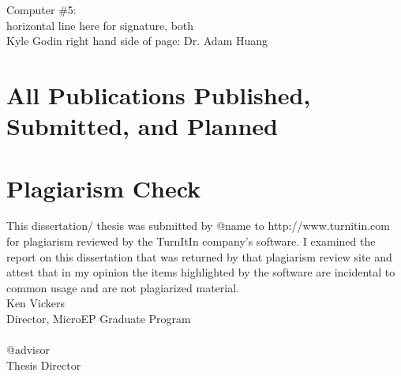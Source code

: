  Computer \#5:\\
 
 horizontal line here for signature, both\\
 Kyle Godin right hand side of page: Dr. Adam Huang
 
 \chapter{All Publications Published, Submitted, and Planned}
 
 \chapter{Plagiarism Check}
 This dissertation/ thesis was submitted by @name to http://www.turnitin.com for plagiarism reviewed by the TurnItIn company's software.  I examined the report on this dissertation that was returned by that plagiarism review site and attest that in my opinion the items highlighted by the software are incidental to common usage and are not plagiarized material.
 \vspace{1in}
 \makebox[1.5in]{\hrulefill}\\
 Ken Vickers\\
 Director, MicroEP Graduate Program\\
 \vspace{1in}
 \makebox[1.5in]{\hrulefill}\\
 @advisor\\
 Thesis Director\\
